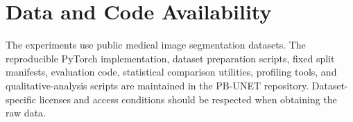 \documentclass[11pt]{article}
\begin{document}
\section*{Data and Code Availability}
The experiments use public medical image segmentation datasets. The reproducible PyTorch implementation, dataset preparation scripts, fixed split manifests, evaluation code, statistical comparison utilities, profiling tools, and qualitative-analysis scripts are maintained in the PB-UNET repository. Dataset-specific licenses and access conditions should be respected when obtaining the raw data.



\end{document}
